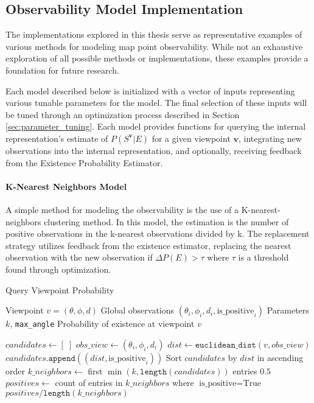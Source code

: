 \subsection{Observability Model Implementation}

The implementations explored in this thesis serve as representative examples of various methods for modeling map point observability. While not an exhaustive exploration of all possible methods or implementations, these examples provide a foundation for future research.

Each model described below is initialized with a vector of inputs representing various tunable parameters for the model. The final selection of these inputs will be tuned through an optimization process described in Section \ref{sec:parameter_tuning}. Each model provides functions for querying the internal representation's estimate of $P(S^{\boldsymbol{v}}|E)$ for a given viewpoint $\boldsymbol{v}$, integrating new observations into the internal representation, and optionally, receiving feedback from the Existence Probability Estimator.

\paragraph{K-Nearest Neighbors Model}

A simple method for modeling the observability is the use of a K-nearest-neighbors clustering method. In this model, the estimation is the number of positive observations in the k-nearest observations divided by k. The replacement strategy utilizes feedback from the existence estimator, replacing the nearest observation with the new observation if $\Delta P(E) > \tau$ where $\tau$ is a threshold found through optimization.

\begin{algorithm}[H]
\caption{Query Viewpoint Probability}
\label{alg:query}
\begin{algorithmic}[1]
\Require Viewpoint $v = (\theta, \phi, d)$
\Require Global observations $(\theta_i, \phi_i, d_i, \text{is\_positive}_i)$
\Require Parameters $k$, \texttt{max\_angle}
\Ensure Probability of existence at viewpoint $v$

\State $candidates \gets [\;]$
    \State $obs\_view \gets (\theta_i, \phi_i, d_i)$
        \State $dist \gets \texttt{euclidean\_dist}(v, obs\_view)$
        \State $candidates.\texttt{append}((dist, \text{is\_positive}_i))$
    \EndIf
\EndFor
\State Sort $candidates$ by $dist$ in ascending order
\State $k\_neighbors \gets$ first $\min(k, \texttt{length}(candidates))$ entries
    \State \Return $0.5$
\EndIf
\State $positives \gets$ count of entries in $k\_neighbors$ where $\text{is\_positive} = \text{True}$
\State \Return $positives / \texttt{length}(k\_neighbors)$
\end{algorithmic}
\end{algorithm}

